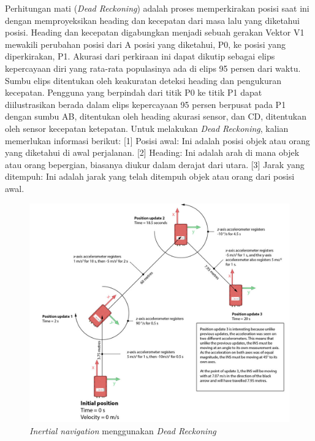 Perhitungan mati (\emph{Dead Reckoning}) adalah proses memperkirakan posisi saat ini dengan memproyeksikan heading dan kecepatan dari masa lalu yang diketahui posisi. 
Heading dan kecepatan digabungkan menjadi sebuah gerakan Vektor V1 mewakili perubahan posisi dari A posisi yang diketahui, P0, ke posisi yang diperkirakan, P1. 
Akurasi dari perkiraan ini dapat dikutip sebagai elips kepercayaan diri yang rata-rata populasinya ada di elips 95 persen dari waktu. Sumbu elips ditentukan oleh 
keakuratan deteksi heading dan pengukuran kecepatan. Pengguna yang berpindah dari titik P0 ke titik P1 dapat diilustrasikan berada dalam elips kepercayaan 95 persen 
berpusat pada P1 dengan sumbu AB, ditentukan oleh heading akurasi sensor, dan CD, ditentukan oleh sensor kecepatan ketepatan.
Untuk melakukan \emph{Dead Reckoning}, kalian memerlukan informasi berikut: [1] Posisi awal: Ini adalah posisi objek atau orang yang diketahui di awal perjalanan.
[2] Heading: Ini adalah arah di mana objek atau orang bepergian, biasanya diukur dalam derajat dari utara.
[3] Jarak yang ditempuh: Ini adalah jarak yang telah ditempuh objek atau orang dari posisi awal.

\begin{figure} [ht] \centering
  \includegraphics[scale=0.45]{gambar/Dead-reckoning-INS.png}
  \caption{\emph{Inertial navigation} menggunakan \emph{Dead Reckoning} \parencite{oxts2020-dr}}
  \label{fig:DR}
\end{figure}

